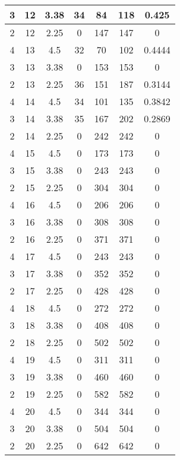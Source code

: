 \documentclass[letterpaper, 12pt]{article}
\begin{document}
\begin{longtable}{|c|c|c|c|c|c|c|}
\hline
3 & 12 & 3.38 & 34 & 84 & 118 & 0.425 \\
\hline
2 & 12 & 2.25 & 0 & 147 & 147 & 0 \\
\hline
4 & 13 & 4.5 & 32 & 70 & 102 & 0.4444 \\
\hline
3 & 13 & 3.38 & 0 & 153 & 153 & 0 \\
\hline
2 & 13 & 2.25 & 36 & 151 & 187 & 0.3144 \\
\hline
4 & 14 & 4.5 & 34 & 101 & 135 & 0.3842 \\
\hline
3 & 14 & 3.38 & 35 & 167 & 202 & 0.2869 \\
\hline
2 & 14 & 2.25 & 0 & 242 & 242 & 0 \\
\hline
4 & 15 & 4.5 & 0 & 173 & 173 & 0 \\
\hline
3 & 15 & 3.38 & 0 & 243 & 243 & 0 \\
\hline
2 & 15 & 2.25 & 0 & 304 & 304 & 0 \\
\hline
4 & 16 & 4.5 & 0 & 206 & 206 & 0 \\
\hline
3 & 16 & 3.38 & 0 & 308 & 308 & 0 \\
\hline
2 & 16 & 2.25 & 0 & 371 & 371 & 0 \\
\hline
4 & 17 & 4.5 & 0 & 243 & 243 & 0 \\
\hline
3 & 17 & 3.38 & 0 & 352 & 352 & 0 \\
\hline
2 & 17 & 2.25 & 0 & 428 & 428 & 0 \\
\hline
4 & 18 & 4.5 & 0 & 272 & 272 & 0 \\
\hline
3 & 18 & 3.38 & 0 & 408 & 408 & 0 \\
\hline
2 & 18 & 2.25 & 0 & 502 & 502 & 0 \\
\hline
4 & 19 & 4.5 & 0 & 311 & 311 & 0 \\
\hline
3 & 19 & 3.38 & 0 & 460 & 460 & 0 \\
\hline
2 & 19 & 2.25 & 0 & 582 & 582 & 0 \\
\hline
4 & 20 & 4.5 & 0 & 344 & 344 & 0 \\
\hline
3 & 20 & 3.38 & 0 & 504 & 504 & 0 \\
\hline
2 & 20 & 2.25 & 0 & 642 & 642 & 0 \\
\hline
\end{longtable}
\end{document}
